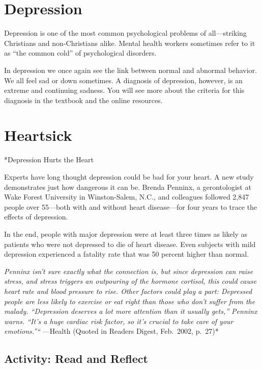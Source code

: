 \documentclass[
]{book}
\begin{document}
\hypertarget{depression}{%
\section{Depression}\label{depression}}

Depression is one of the most common psychological problems of all---striking Christians and non-Christians alike. Mental health workers sometimes refer to it as ``the common cold'' of psychological disorders.

In depression we once again see the link between normal and abnormal behavior. We all feel sad or down sometimes. A diagnosis of depression, however, is an extreme and continuing sadness. You will see more about the criteria for this diagnosis in the textbook and the online resources.

\hypertarget{heartsick}{%
\section{Heartsick}\label{heartsick}}

*Depression Hurts the Heart

Experts have long thought depression could be bad for your heart. A new study demonstrates just how dangerous it can be. Brenda Penninx, a gerontologist at Wake Forest University in Winston-Salem, N.C., and colleagues followed 2,847 people over 55---both with and without heart disease---for four years to trace the effects of depression.

In the end, people with major depression were at least three times as likely as patients who were not depressed to die of heart disease. Even subjects with mild depression experienced a fatality rate that was 50 percent higher than normal.

\emph{Penninx isn't sure exactly what the connection is, but since depression can raise stress, and stress triggers an outpouring of the hormone cortisol, this could cause heart rate and blood pressure to rise. Other factors could play a part: Depressed people are less likely to exercise or eat right than those who don't suffer from the malady. ``Depression deserves a lot more attention than it usually gets,'' Penninx warns. ``It's a huge cardiac risk factor, so it's crucial to take care of your emotions.''``} ---Health (Quoted in Readers Digest, Feb.~2002, p.~27)*

\hypertarget{activity-read-and-reflect-17}{%
\subsection*{Activity: Read and Reflect}\label{activity-read-and-reflect-17}}
\end{document}
